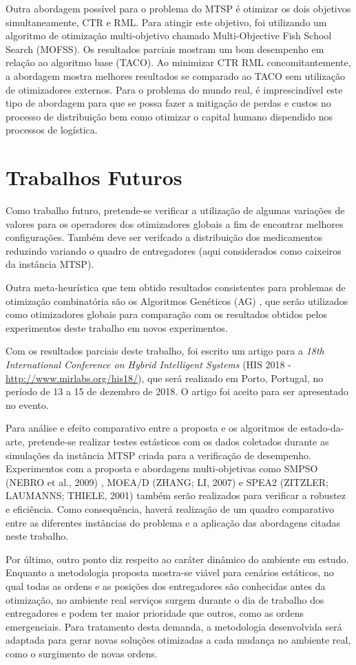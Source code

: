 Outra abordagem possível para o problema do MTSP é otimizar os dois objetivos simultaneamente, CTR e RML. Para atingir este objetivo, foi utilizando um algoritmo de otimização multi-objetivo chamado Multi-Objective Fish School Search (MOFSS). Os resultados parciais mostram um bom desempenho em relação ao algoritmo base (TACO). Ao minimizar CTR RML concomitantemente, a abordagem mostra melhores resultados se comparado ao TACO sem utilização de otimizadores externos. Para o problema do mundo real, é imprescindível este tipo de abordagem para que se possa fazer a mitigação de perdas e custos no processo de distribuição bem como otimizar o capital humano dispendido nos processos de logística.

\section{Trabalhos Futuros}

Como trabalho futuro, pretende-se verificar a utilização de algumas variações de valores para os operadores dos otimizadores globais a fim de encontrar melhores configurações. Também deve ser verifcado a distribuição dos medicamentos reduzindo variando o quadro de entregadores (aqui considerados como caixeiros da instância MTSP).

Outra meta-heurística que tem obtido resultados consistentes para problemas de otimização combinatória são os Algoritmos Genéticos (AG) \cite{somhom1999competition}, que serão utilizados como otimizadores globais para comparação com os resultados obtidos pelos experimentos deste trabalho em novos experimentos.

Com os resultados parciais deste trabalho, foi escrito um artigo para a \textit{18th International Conference on Hybrid Intelligent Systems} (HIS 2018 - \url{http://www.mirlabs.org/his18/}), que será realizado em Porto, Portugal, no período de 13 a 15 de dezembro de 2018. O artigo foi aceito para ser apresentado no evento.

Para análise e efeito comparativo entre a proposta e os algoritmos de estado-da-arte, pretende-se realizar testes estásticos com os dados coletados durante as simulações da instância MTSP criada para a verificação de desempenho. Experimentos com a proposta e abordagens multi-objetivas como SMPSO (NEBRO et al., 2009) \cite{nebro2009}, MOEA/D (ZHANG; LI, 2007) \cite{zhang2007} e SPEA2 (ZITZLER; LAUMANNS; THIELE, 2001) \cite{zitzler2001} também serão realizados para verificar a robustez e eficiência. Como consequência, haverá realização de um quadro comparativo entre as diferentes instâncias do problema e a aplicação das abordagens citadas neste trabalho.

Por último, outro ponto diz respeito ao caráter dinâmico do ambiente em estudo. Enquanto a metodologia proposta mostra-se viável para cenários estáticos, no qual todas as ordens e as posições dos entregadores são conhecidas antes da otimização, no ambiente real serviços surgem durante o dia de trabalho dos entregadores e podem ter maior prioridade que outros, como as ordens emergenciais. Para tratamento desta demanda, a metodologia desenvolvida será adaptada para gerar novas soluções otimizadas a cada mudança no ambiente real, como o surgimento de novas ordens.